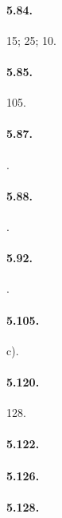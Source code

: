 \begin{multicols}{2}
\paragraph{5.84.} 15; 25; 10.

\paragraph{5.85.} 105.

\paragraph{5.87.} \boxE.

\paragraph{5.88.} \boxE.

\paragraph{5.92.} \boxD.

\paragraph{5.105.} c).

\paragraph{5.120.} 128.

\paragraph{5.122.} \boxC\quad\boxD

\paragraph{5.126.} \boxE

\paragraph{5.128.} \boxA\quad\boxC

\end{multicols}
